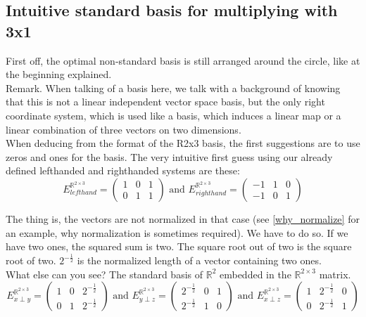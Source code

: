 \documentclass[a4paper]{article}
\begin{document}
\begin{Example}
\begin{PropositionOpt4}
\subsection{Intuitive standard basis for multiplying with 3x1}
\label{intuitive_standard_basis}
First off, the optimal non-standard basis is still arranged around the circle, like at the beginning explained.\\

Remark. When talking of a basis here, we talk with a background of knowing that this is not a linear independent vector space basis, but the only right coordinate system, which is used like a basis, which induces a linear map or a linear combination of three vectors on two dimensions.\\

When deducing from the format of the R2x3 basis, the first suggestions are to use zeros and ones for the basis. The very intuitive first guess using our already defined lefthanded and righthanded systems are these:\\

\begin{displaymath}
    E^{\mathbb{R}^{2\times{3}}}_{lefthand} = \begin{pmatrix}1&0&1\\0&1&1\end{pmatrix} \mbox{ and }
    E^{\mathbb{R}^{2\times{3}}}_{righthand} = \begin{pmatrix}-1&1&0\\-1&0&1\end{pmatrix}
\end{displaymath}

The thing is, the vectors are not normalized in that case (see \ref{why_normalize} for an example, why normalization is sometimes required). We have to do so. If we have two ones, the squared sum is two. The square root out of two is the square root of two. $2^{-\frac12}$ is the normalized length of a vector containing two ones.\\

What else can you see? The standard basis of $\mathbb{R}^{2}$ embedded in the $\mathbb{R}^{2\times3}$ matrix.\\

\begin{displaymath}
    E^{\mathbb{R}^{2\times{3}}}_{x\perp y} = \begin{pmatrix}1&0&2^{-\frac12}\\0&1&2^{-\frac12}\end{pmatrix} \mbox{ and }
    E^{\mathbb{R}^{2\times{3}}}_{y\perp z} = \begin{pmatrix}2^{-\frac12}&0&1\\2^{-\frac12}&1&0\end{pmatrix} \mbox{ and }
    E^{\mathbb{R}^{2\times{3}}}_{x\perp z} = \begin{pmatrix}1&2^{-\frac12}&0\\0&2^{-\frac12}&1\end{pmatrix} 
\end{displaymath}


\end{PropositionOpt4}
\end{Example}
\end{document}
